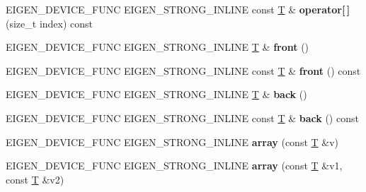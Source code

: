 \begin{DoxyCompactItemize}
E\+I\+G\+E\+N\+\_\+\+D\+E\+V\+I\+C\+E\+\_\+\+F\+U\+NC E\+I\+G\+E\+N\+\_\+\+S\+T\+R\+O\+N\+G\+\_\+\+I\+N\+L\+I\+NE const \hyperlink{group___sparse_core___module}{T} \& {\bfseries operator\mbox{[}$\,$\mbox{]}} (size\+\_\+t index) const
\item 
\mbox{\label{class_eigen_1_1array_a8a1dd3892a6ed3f467f9028937364ff1}} 
E\+I\+G\+E\+N\+\_\+\+D\+E\+V\+I\+C\+E\+\_\+\+F\+U\+NC E\+I\+G\+E\+N\+\_\+\+S\+T\+R\+O\+N\+G\+\_\+\+I\+N\+L\+I\+NE \hyperlink{group___sparse_core___module}{T} \& {\bfseries front} ()
\item 
\mbox{\label{class_eigen_1_1array_a6aec8186a7e5238df83def54d6723d5c}} 
E\+I\+G\+E\+N\+\_\+\+D\+E\+V\+I\+C\+E\+\_\+\+F\+U\+NC E\+I\+G\+E\+N\+\_\+\+S\+T\+R\+O\+N\+G\+\_\+\+I\+N\+L\+I\+NE const \hyperlink{group___sparse_core___module}{T} \& {\bfseries front} () const
\item 
\mbox{\label{class_eigen_1_1array_a32c7d69554a18b05b6c7b52d9744ff5e}} 
E\+I\+G\+E\+N\+\_\+\+D\+E\+V\+I\+C\+E\+\_\+\+F\+U\+NC E\+I\+G\+E\+N\+\_\+\+S\+T\+R\+O\+N\+G\+\_\+\+I\+N\+L\+I\+NE \hyperlink{group___sparse_core___module}{T} \& {\bfseries back} ()
\item 
\mbox{\label{class_eigen_1_1array_a7abe26988254e5c892288003ae1c17ae}} 
E\+I\+G\+E\+N\+\_\+\+D\+E\+V\+I\+C\+E\+\_\+\+F\+U\+NC E\+I\+G\+E\+N\+\_\+\+S\+T\+R\+O\+N\+G\+\_\+\+I\+N\+L\+I\+NE const \hyperlink{group___sparse_core___module}{T} \& {\bfseries back} () const
\item 
\mbox{\label{class_eigen_1_1array_a281f70fe2eb91c409832b973aa74e5fc}} 
E\+I\+G\+E\+N\+\_\+\+D\+E\+V\+I\+C\+E\+\_\+\+F\+U\+NC E\+I\+G\+E\+N\+\_\+\+S\+T\+R\+O\+N\+G\+\_\+\+I\+N\+L\+I\+NE {\bfseries array} (const \hyperlink{group___sparse_core___module}{T} \&v)
\item 
\mbox{\label{class_eigen_1_1array_a5aa7daaa1106cfb174a81b16eb13e816}} 
E\+I\+G\+E\+N\+\_\+\+D\+E\+V\+I\+C\+E\+\_\+\+F\+U\+NC E\+I\+G\+E\+N\+\_\+\+S\+T\+R\+O\+N\+G\+\_\+\+I\+N\+L\+I\+NE {\bfseries array} (const \hyperlink{group___sparse_core___module}{T} \&v1, const \hyperlink{group___sparse_core___module}{T} \&v2)
\item 
\mbox{\label{class_eigen_1_1array_a18f9de84e4fd405b9207670b5d48bbcc}} 

\end{DoxyCompactItemize}
